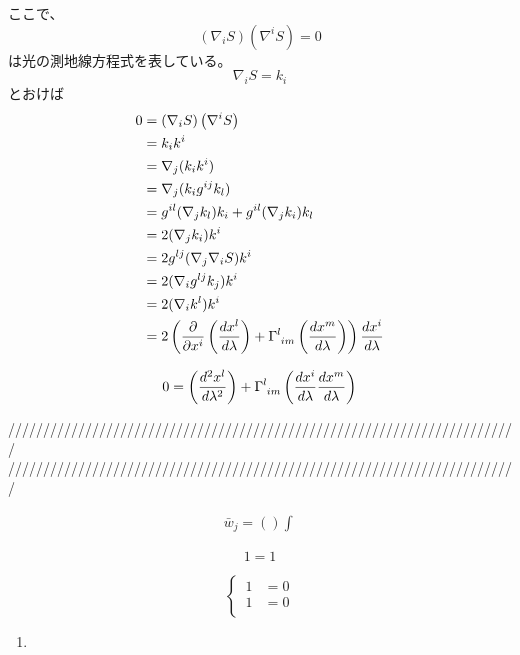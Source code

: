 \documentclass[dvipdfmx]{report} %
\begin{document}
ここで、\[ \left( \nabla_i S \right) \left( \nabla^i S \right) = 0 \]は光の測地線方程式を表している。
\[ \nabla_i S  =  k_i \]とおけば
\begin{equation*}
\begin{split}
	0 &= \left( \nabla_i S \right) \left( \nabla^i S \right)\\
	&= k_i k^i\\
	&= \nabla_j (k_i k^i)\\
	&= \nabla_j (k_i g^{ij} k_l)\\
	&= g^{il} (\nabla_j k_l)k_i + g^{il} (\nabla_j k_i)k_l\\
	&= 2(\nabla_j k_i)k^i\\
	&= 2 g^{lj} (\nabla_j \nabla_i S)k^i\\
	&= 2 (\nabla_i g^{lj}  k_j)k^i\\
	&= 2 (\nabla_i k^l)k^i\\
	&= 2\left( \frac{\partial}{\partial x^i} \left( \frac{dx^l}{d\lambda} \right) + \tensor{\Gamma}{^l_{im}} \left( \frac{dx^m}{d\lambda} \right) \right) \frac{dx^i}{d\lambda}
\end{split}
\end{equation*}
\begin{tcolorbox}[title=光の測地線方程式]
\begin{eqnarray*}
	0 = \left( \frac{d^2 x^l}{d\lambda^2} \right) + \tensor{\Gamma}{^l_{im}} \left( \frac{dx^i}{d\lambda}\frac{dx^m}{d\lambda} \right)
\end{eqnarray*}
\end{tcolorbox}



\noindent
/////////////////////////////////////////////////////////////////////////\\
/////////////////////////////////////////////////////////////////////////

\begin{equation*}
\begin{split}
	\bar{w}_j = \left( \right) \int^{}_{}
\end{split}
\end{equation*}

\begin{tcolorbox}[title=メモ用]
\[ 1 = 1 \]
\end{tcolorbox}

\begin{equation}
\left\{ \,
\begin{aligned}
	1 &= 0\\
	1 &= 0\\
\end{aligned}
\right.
\end{equation}


\begin{enumerate}[(1)\,]
\item{}
\end{enumerate}
\end{document}
